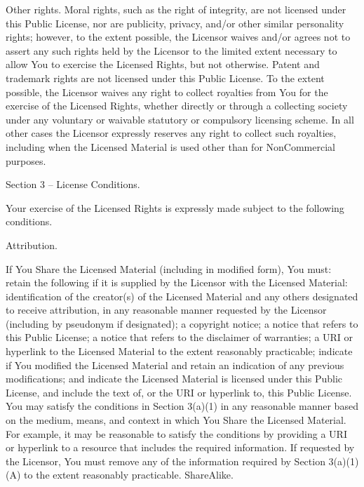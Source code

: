 {    Other rights.
        Moral rights, such as the right of integrity, are not licensed under this Public License, nor are publicity, privacy, and/or other similar personality rights; however, to the extent possible, the Licensor waives and/or agrees not to assert any such rights held by the Licensor to the limited extent necessary to allow You to exercise the Licensed Rights, but not otherwise.
        Patent and trademark rights are not licensed under this Public License.
        To the extent possible, the Licensor waives any right to collect royalties from You for the exercise of the Licensed Rights, whether directly or through a collecting society under any voluntary or waivable statutory or compulsory licensing scheme. In all other cases the Licensor expressly reserves any right to collect such royalties, including when the Licensed Material is used other than for NonCommercial purposes.

Section 3 – License Conditions.

Your exercise of the Licensed Rights is expressly made subject to the following conditions.

    Attribution.

        If You Share the Licensed Material (including in modified form), You must:
            retain the following if it is supplied by the Licensor with the Licensed Material:
                identification of the creator(s) of the Licensed Material and any others designated to receive attribution, in any reasonable manner requested by the Licensor (including by pseudonym if designated);
                a copyright notice;
                a notice that refers to this Public License;
                a notice that refers to the disclaimer of warranties;
                a URI or hyperlink to the Licensed Material to the extent reasonably practicable;
            indicate if You modified the Licensed Material and retain an indication of any previous modifications; and
            indicate the Licensed Material is licensed under this Public License, and include the text of, or the URI or hyperlink to, this Public License.
        You may satisfy the conditions in Section 3(a)(1) in any reasonable manner based on the medium, means, and context in which You Share the Licensed Material. For example, it may be reasonable to satisfy the conditions by providing a URI or hyperlink to a resource that includes the required information.
        If requested by the Licensor, You must remove any of the information required by Section 3(a)(1)(A) to the extent reasonably practicable.
    ShareAlike.

}
